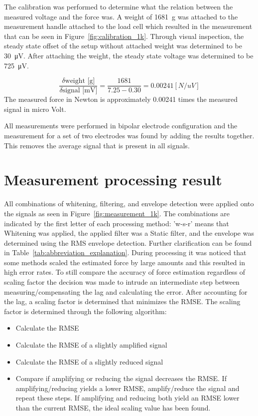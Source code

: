 The calibration was performed to determine what the relation between the measured voltage and the force was. A weight of \SI{1681}{\gram} was attached to the measurement handle attached to the load cell which resulted in the measurement that can be seen in Figure~\ref{fig:calibration_1k}. Through visual inspection, the steady state offset of the setup without attached weight was determined to be \SI{30}{\micro\volt}. After attaching the weight, the steady state voltage was determined to be \SI{725}{\micro\volt}.

\begin{equation}
    \frac{\delta \text{weight [g]}}{\delta \text{signal [mV]}} = \frac{1681}{7.25-0.30} = 0.00241 [N/uV]
\end{equation}
The measured force in Newton is approximately 0.00241 times the measured signal in micro Volt.

All measurements were performed in bipolar electrode configuration and the measurement for a set of two electrodes was found by adding the results together. This removes the average signal that is present in all signals.

\section{Measurement processing result}
All combinations of whitening, filtering, and envelope detection were applied onto the signals as seen in Figure~\ref{fig:measurement_1k}. The combinations are indicated by the first letter of each processing method: 'w-s-r' means that Whitening was applied, the applied filter was a Static filter, and the envelope was determined using the RMS envelope detection. Further clarification can be found in Table~\ref{tab:abbreviation_explanation}.
During processing it was noticed that some methods scaled the estimated force by large amounts and this resulted in high error rates. To still compare the accuracy of force estimation regardless of scaling factor the decision was made to intrude an intermediate step between measuring/compensating the lag and calculating the error. After accounting for the lag, a scaling factor is determined that minimizes the RMSE. The scaling factor is determined through the following algorithm:
\begin{itemize}
    \item Calculate the RMSE
    \item Calculate the RMSE of a slightly amplified signal
    \item Calculate the RMSE of a slightly reduced signal
    \item Compare if amplifying or reducing the signal decreases the RMSE. If amplifying/reducing yields a lower RMSE, amplify/reduce the signal and repeat these steps. If amplifying and reducing both yield an RMSE lower than the current RMSE, the ideal scaling value has been found.
\end{itemize}

